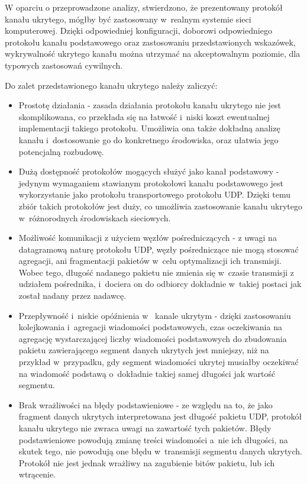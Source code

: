 \documentclass[a4paper, twoside, openright, 12pt]{report}
\begin{document}
    W oparciu o  przeprowadzone analizy, stwierdzono, że prezentowany protokół
    kanału ukrytego, mógłby być zastosowany w~realnym systemie sieci komputerowej.
    Dzięki odpowiedniej konfiguracji, doborowi odpowiedniego protokołu kanału
    podstawowego oraz zastosowaniu przedstawionych wskazówek,
    wykrywalność ukrytego kanału można utrzymać na akceptowalnym
    poziomie, dla typowych zastosowań cywilnych.

    Do zalet przedstawionego kanału ukrytego należy zaliczyć:
    \begin{itemize}
        \item Prostotę działania - zasada działania protokołu kanału ukrytego
            nie jest skomplikowana, co przekłada się na łatwość i~niski koszt
            ewentualnej implementacji takiego protokołu. Umożliwia ona także
            dokładną analizę kanału i~dostosowanie go do konkretnego środowiska,
            oraz ułatwia jego potencjalną rozbudowę.
        \item Dużą dostępność protokołów mogących służyć jako kanał podstawowy -
            jedynym wymaganiem stawianym protokołowi kanału podstawowego jest
            wykorzystanie jako protokołu transportowego protokołu UDP. Dzięki temu
            zbiór takich protokołów jest duży, co umożliwia zastosowanie kanału
            ukrytego w~różnorodnych środowiskach sieciowych.
        \item Możliwość komunikacji z użyciem węzłów pośredniczących - z uwagi
            na datagramową naturę protokołu UDP, węzły pośredniczące nie mogą stosować
            agregacji, ani fragmentacji pakietów w~celu optymalizacji ich transmisji.
            Wobec tego, długość nadanego pakietu nie zmienia się w~czasie transmisji
            z udziałem pośrednika, i~dociera on do odbiorcy dokładnie w~takiej postaci
            jak został nadany przez nadawcę.
        \item Przepływność i~niskie opóźnienia w~ kanale ukrytym - dzięki
            zastosowaniu kolejkowania i~agregacji wiadomości podstawowych,
            czas oczekiwania na agregację wystarczającej liczby wiadomości podstawowych do zbudowania
            pakietu zawierającego segment danych ukrytych jest mniejszy, niż na przykład
            w~przypadku, gdy segment wiadomości ukrytej musiałby oczekiwać na
            wiadomość podstawą o~dokładnie takiej samej długości jak wartość segmentu.
        \item Brak wrażliwości na błędy podstawieniowe - ze względu na to, że jako
            fragment danych ukrytych interpretowana jest długość pakietu UDP, protokół
            kanału ukrytego nie zwraca uwagi na zawartość tych pakietów.
            Błędy podstawieniowe powodują zmianę treści wiadomości a~nie ich długości, na skutek tego,
            nie powodują one błędu w~transmisji segmentu danych ukrytych. Protokół
            nie jest jednak wrażliwy na zagubienie bitów pakietu, lub ich wtrącenie.
    \end{itemize}
\end{document}
